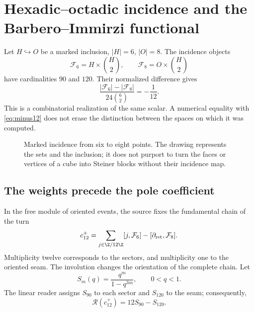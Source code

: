 \section{Hexadic--octadic incidence and the Barbero--Immirzi functional}
\label{sec:barbero}
Let $H\hookrightarrow O$ be a marked inclusion, $|H|=6$, $|O|=8$.
The incidence objects
\[
\mathcal F_6=H\times\binom H2,\qquad
\mathcal F_8=O\times\binom H2
\]
have cardinalities $90$ and $120$. Their normalized difference gives
\[
\frac{|\mathcal F_6|-|\mathcal F_8|}{24\binom62}=-\frac1{12}.
\]
This is a combinatorial realization of the same scalar.
A numerical equality with \eqref{eq:minus12} does not erase
the distinction between the spaces on which it was computed.

\begin{figure}[htbp]
\centering
{}
\caption{Marked incidence from six to eight points. The drawing represents
the sets and the inclusion; it does not purport to turn the faces or vertices
of a cube into Steiner blocks without their incidence map.}
\end{figure}

\subsection{The weights precede the pole coefficient}
In the free module of oriented events, the source fixes the
fundamental chain of the turn \cite{precedencia}
\[
c_{12}^{+}=
\sum_{j\in\Z/12\Z}[j,\mathcal F_6]
-[\partial_{\rm ret},\mathcal F_8].
\]
Multiplicity twelve corresponds to the sectors, and multiplicity one
to the oriented seam. The involution changes the orientation of the complete
chain. Let
\[
S_m(q)=\frac{q^m}{1-q^{3m}},\qquad 0<q<1.
\]
The linear reader assigns $S_{90}$ to each sector and $S_{120}$ to the seam;
consequently,
\[
\mathscr R(c_{12}^{+})=12S_{90}-S_{120}.
\]

